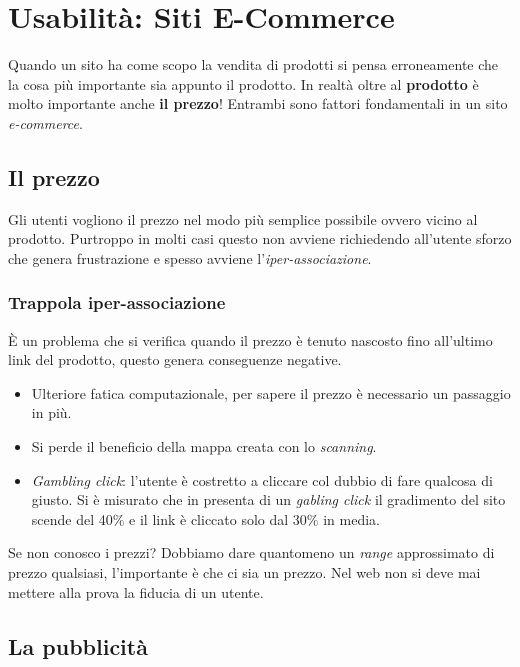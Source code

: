 
\chapter{Usabilità: Siti E-Commerce}
	Quando un sito ha come scopo la vendita di prodotti si pensa erroneamente che la cosa più importante sia appunto il prodotto. In realtà oltre al \textbf{prodotto} è molto importante anche \textbf{il prezzo}! Entrambi sono fattori fondamentali in un sito \emph{e-commerce}.

	\section{Il prezzo}
		Gli utenti vogliono il prezzo nel modo più semplice possibile ovvero vicino al prodotto. Purtroppo in molti casi questo non avviene richiedendo all'utente sforzo che genera frustrazione e spesso avviene l'\emph{iper-associazione}.
	
		\subsection{Trappola iper-associazione}
			È un problema che si verifica quando il prezzo è tenuto nascosto fino all'ultimo link del prodotto, questo genera conseguenze negative.
			\begin{itemize}
				\item Ulteriore fatica computazionale, per sapere il prezzo è necessario un passaggio in più.
				\item Si perde il beneficio della mappa creata con lo \emph{scanning}.
				\item \emph{Gambling click}: l'utente è costretto a cliccare col dubbio di fare qualcosa di giusto. Si è misurato che in presenta di un \emph{gabling click} il gradimento del sito scende del 40\% e il link è cliccato solo dal 30\% in media.
			\end{itemize}
			Se non conosco i prezzi? Dobbiamo dare quantomeno un \emph{range} approssimato di prezzo qualsiasi, l'importante è che ci sia un prezzo. Nel web non si deve mai mettere alla prova la fiducia di un utente.
	
	\section{La pubblicità}
		
